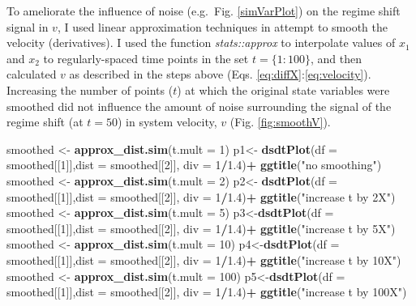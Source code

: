 \documentclass[12pt,twoside,openany]{reedthesis}
\newenvironment{Shaded}{\begin{snugshade}}{\end{snugshade}}
\newcommand{\KeywordTok}[1]{\textcolor[rgb]{0.13,0.29,0.53}{\textbf{#1}}}
\newcommand{\DataTypeTok}[1]{\textcolor[rgb]{0.13,0.29,0.53}{#1}}
\newcommand{\DecValTok}[1]{\textcolor[rgb]{0.00,0.00,0.81}{#1}}
\newcommand{\FloatTok}[1]{\textcolor[rgb]{0.00,0.00,0.81}{#1}}
\newcommand{\StringTok}[1]{\textcolor[rgb]{0.31,0.60,0.02}{#1}}
\newcommand{\OperatorTok}[1]{\textcolor[rgb]{0.81,0.36,0.00}{\textbf{#1}}}
\newcommand{\NormalTok}[1]{#1}
\begin{document}
To ameliorate the influence of noise (e.g.~Fig. \ref{simVarPlot}) on the
regime shift signal in \(v\), I used linear approximation techniques in
attempt to smooth the velocity (derivatives). I used the function
\emph{stats::approx} to interpolate values of \(x_1\) and \(x_2\) to
regularly-spaced time points in the set \(t=\{1:100\}\), and then
calculated \(v\) as described in the steps above (Eqs.
\eqref{eq:diffX}:\eqref{eq:velocity}). Increasing the number of points
(\(t\)) at which the original state variables were smoothed did not
influence the amount of noise surrounding the signal of the regime shift
(at \(t=50\)) in system velocity, \(v\) (Fig. \ref{fig:smoothV}).
\begin{Shaded}
\begin{Highlighting}[]
\NormalTok{smoothed <-}\StringTok{ }\KeywordTok{approx_dist.sim}\NormalTok{(}\DataTypeTok{t.mult =} \DecValTok{1}\NormalTok{)}
\NormalTok{p1<-}\StringTok{ }\KeywordTok{dsdtPlot}\NormalTok{(}\DataTypeTok{df =}\NormalTok{ smoothed[[}\DecValTok{1}\NormalTok{]],}\DataTypeTok{dist =}\NormalTok{ smoothed[[}\DecValTok{2}\NormalTok{]], }\DataTypeTok{div =} \DecValTok{1}\OperatorTok{/}\FloatTok{1.4}\NormalTok{)}\OperatorTok{+}
\StringTok{  }\KeywordTok{ggtitle}\NormalTok{(}\StringTok{"no smoothing"}\NormalTok{)}
\NormalTok{smoothed <-}\StringTok{ }\KeywordTok{approx_dist.sim}\NormalTok{(}\DataTypeTok{t.mult =} \DecValTok{2}\NormalTok{)}
\NormalTok{p2<-}\StringTok{ }\KeywordTok{dsdtPlot}\NormalTok{(}\DataTypeTok{df =}\NormalTok{ smoothed[[}\DecValTok{1}\NormalTok{]],}\DataTypeTok{dist =}\NormalTok{ smoothed[[}\DecValTok{2}\NormalTok{]], }\DataTypeTok{div =} \DecValTok{1}\OperatorTok{/}\FloatTok{1.4}\NormalTok{)}\OperatorTok{+}
\StringTok{  }\KeywordTok{ggtitle}\NormalTok{(}\StringTok{"increase t by 2X"}\NormalTok{)}
\NormalTok{smoothed <-}\StringTok{ }\KeywordTok{approx_dist.sim}\NormalTok{(}\DataTypeTok{t.mult =} \DecValTok{5}\NormalTok{)}
\NormalTok{p3<-}\KeywordTok{dsdtPlot}\NormalTok{(}\DataTypeTok{df =}\NormalTok{ smoothed[[}\DecValTok{1}\NormalTok{]],}\DataTypeTok{dist =}\NormalTok{ smoothed[[}\DecValTok{2}\NormalTok{]], }\DataTypeTok{div =} \DecValTok{1}\OperatorTok{/}\FloatTok{1.4}\NormalTok{)}\OperatorTok{+}
\StringTok{  }\KeywordTok{ggtitle}\NormalTok{(}\StringTok{"increase t by 5X"}\NormalTok{)}
\NormalTok{smoothed <-}\StringTok{ }\KeywordTok{approx_dist.sim}\NormalTok{(}\DataTypeTok{t.mult =} \DecValTok{10}\NormalTok{)}
\NormalTok{p4<-}\KeywordTok{dsdtPlot}\NormalTok{(}\DataTypeTok{df =}\NormalTok{ smoothed[[}\DecValTok{1}\NormalTok{]],}\DataTypeTok{dist =}\NormalTok{ smoothed[[}\DecValTok{2}\NormalTok{]], }\DataTypeTok{div =} \DecValTok{1}\OperatorTok{/}\FloatTok{1.4}\NormalTok{)}\OperatorTok{+}
\StringTok{  }\KeywordTok{ggtitle}\NormalTok{(}\StringTok{"increase t by 10X"}\NormalTok{)}
\NormalTok{smoothed <-}\StringTok{ }\KeywordTok{approx_dist.sim}\NormalTok{(}\DataTypeTok{t.mult =} \DecValTok{100}\NormalTok{)}
\NormalTok{p5<-}\KeywordTok{dsdtPlot}\NormalTok{(}\DataTypeTok{df =}\NormalTok{ smoothed[[}\DecValTok{1}\NormalTok{]],}\DataTypeTok{dist =}\NormalTok{ smoothed[[}\DecValTok{2}\NormalTok{]], }\DataTypeTok{div =} \DecValTok{1}\OperatorTok{/}\FloatTok{1.4}\NormalTok{)}\OperatorTok{+}
\StringTok{  }\KeywordTok{ggtitle}\NormalTok{(}\StringTok{"increase t by 100X"}\NormalTok{)}


\end{Highlighting}
\end{Shaded}
\end{document}
